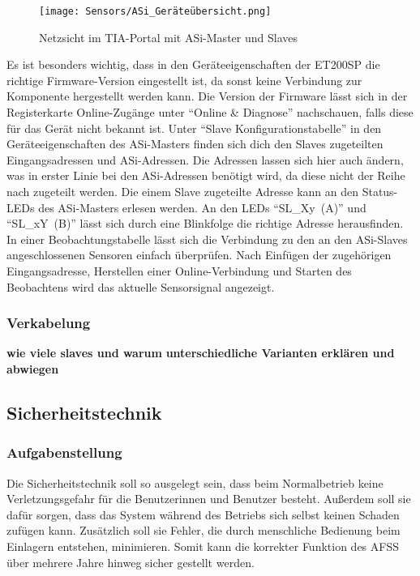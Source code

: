 \begin{figure}[H]
    \centering
    \texttt{[image: Sensors/ASi\_Geräteübersicht.png]}
    \caption{Netzsicht im TIA-Portal mit ASi-Master und Slaves}
    \label{ASi-Netzansicht}
\end{figure}

Es ist besonders wichtig, dass in den Geräteeigenschaften der ET200SP die richtige Firmware-Version eingestellt ist, da sonst keine Verbindung zur Komponente hergestellt werden kann. Die Version der Firmware lässt sich in der Registerkarte Online-Zugänge unter \enquote{Online \& Diagnose} nachschauen, falls diese für das Gerät nicht bekannt ist. Unter \enquote{Slave Konfigurationstabelle} in den Geräteeigenschaften des ASi-Masters finden sich dich den Slaves zugeteilten Eingangsadressen und ASi-Adressen. Die Adressen lassen sich hier auch ändern, was in erster Linie bei den ASi-Adressen benötigt wird, da diese nicht der Reihe nach zugeteilt werden. Die einem Slave zugeteilte Adresse kann an den Status-LEDs des ASi-Masters erlesen werden. An den LEDs \enquote{\mbox{SL\_Xy (A)}} und \enquote{\mbox{SL\_xY (B)}} lässt sich durch eine Blinkfolge die richtige Adresse herausfinden.\cite{ASi-Master_Handbuch}\\
In einer Beobachtungstabelle lässt sich die Verbindung zu den an den ASi-Slaves angeschlossenen Sensoren einfach überprüfen. Nach Einfügen der zugehörigen Eingangsadresse, Herstellen einer Online-Verbindung und Starten des Beobachtens wird das aktuelle Sensorsignal angezeigt.

\subsubsection{Verkabelung}
\textbf{wie viele slaves und warum}
\textbf{unterschiedliche Varianten erklären und abwiegen}

\subsection{Sicherheitstechnik}
\subsubsection{Aufgabenstellung}
Die Sicherheitstechnik soll so ausgelegt sein, dass beim Normalbetrieb keine Verletzungsgefahr für die Benutzerinnen und Benutzer besteht. Außerdem soll sie dafür sorgen, dass das System während des Betriebs sich selbst keinen Schaden zufügen kann. Zusätzlich soll sie Fehler, die durch menschliche Bedienung beim Einlagern entstehen, minimieren. Somit kann die korrekter Funktion des AFSS über mehrere Jahre hinweg sicher gestellt werden.

